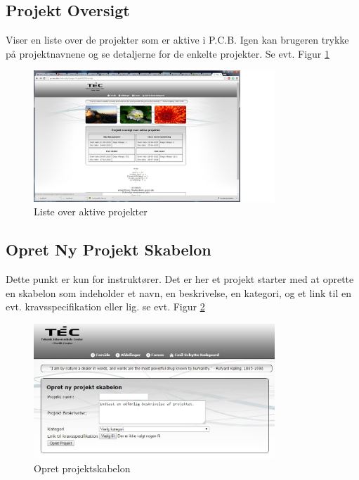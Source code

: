 \documentclass{article}
\begin{document}
\subsection*{Projekt Oversigt}
Viser en liste over de projekter som er aktive i P.C.B. Igen kan brugeren trykke på projektnavnene og se detaljerne for de enkelte projekter. Se evt. Figur \ref{fig:4} 
\begin{figure}[ht]
\includegraphics[width=343px]{aktiveprojekter.jpg}
\caption{Liste over aktive projekter}
\label{fig:4}
\end{figure}
\newpage

\subsection*{Opret Ny Projekt Skabelon}
Dette punkt er kun for instruktører. Det er her et projekt starter med at oprette en skabelon som indeholder et navn, en beskrivelse, en kategori, og et link til en evt. kravsspecifikation eller lig. se evt. Figur \ref{fig:5}
\begin{figure}[ht]
\includegraphics[width=343px]{nyprotemp.jpg}
\caption{Opret projektskabelon}
\label{fig:5}
\end{figure}
\newpage
\end{document}

